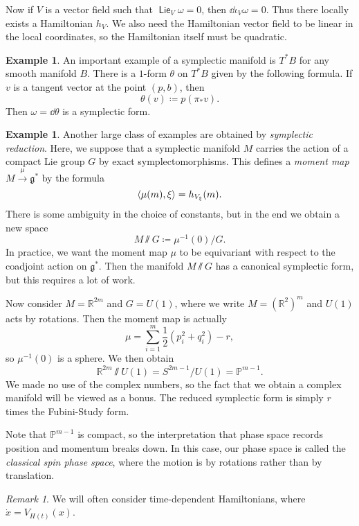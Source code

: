 \documentclass[leqno, openany]{memoir}
\theoremstyle{definition}
\newtheorem{exm}[thm]{Example}
\theoremstyle{remark}
\newtheorem{rmk}[thm]{Remark}
\theoremstyle{plain}
\theoremstyle{definition}
\theoremstyle{remark}
\newcommand{\R}{\mathbb{R}}
\renewcommand{\P}{\mathbb{P}}
\newcommand{\g}{\mathfrak{g}}
\newcommand{\ms}[1]{\mathsf{#1}}
\newcommand{\on}[1]{\operatorname{#1}}
\begin{document}
Now if $V$ is a vector field such that $\on{\ms{Lie}}_V \omega = 0$, then $\dd{\iota_V \omega} = 0$. Thus there locally exists a Hamiltonian $h_V$. We also need the Hamiltonian vector field to be linear in the local coordinates, so the Hamiltonian itself must be quadratic.

\begin{exm}
  An important example of a symplectic manifold is $T^* B$ for any smooth manifold $B$. There is a $1$-form $\theta$ on $T^* B$ given by the following formula. If $v$ is a tangent vector at the point $(p,b)$, then
  \[ \theta(v) \coloneqq p(\pi_* v). \]
  Then $\omega = \dd{\theta}$ is a symplectic form.
\end{exm}

\begin{exm}
  Another large class of examples are obtained by \textit{symplectic reduction}. Here, we suppose that a symplectic manifold $M$ carries the action of a compact Lie group $G$ by exact symplectomorphisms. This defines a \textit{moment map} $M \xrightarrow{\mu} \g^*$ by the formula
  \[ \ev{\mu(m), \xi} = h_{V_{\xi}}(m). \]
  There is some ambiguity in the choice of constants, but in the end we obtain a new space
  \[ M \sslash G \coloneqq \mu^{-1}(0) / G. \]
  In practice, we want the moment map $\mu$ to be equivariant with respect to the coadjoint action on $\g^*$. Then the manifold $M \sslash G$ has a canonical symplectic form, but this requires a lot of work.

  Now consider $M = \R^{2m}$ and $G = U(1)$, where we write $M = (\R^2)^m$ and $U(1)$ acts by rotations. Then the moment map is actually
  \[ \mu = \sum_{i=1}^m \frac{1}{2} (p_i^2 + q_i^2) - r, \]
  so $\mu^{-1}(0)$ is a sphere. We then obtain
  \[ \R^{2m} \sslash U(1) = S^{2m-1}/U(1) = \P^{m-1}. \]
  We made no use of the complex numbers, so the fact that we obtain a complex manifold will be viewed as a bonus. The reduced symplectic form is simply $r$ times the Fubini-Study form.

  Note that $\P^{m-1}$ is compact, so the interpretation that phase space records position and momentum breaks down. In this case, our phase space is called the \textit{classical spin phase space}, where the motion is by rotations rather than by translation.
\end{exm}

\begin{rmk}
  We will often consider time-dependent Hamiltonians, where $\dot{x} = V_{H(t)}(x)$.
\end{rmk}
\end{document}
